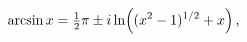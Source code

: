 \[\mathop{\mathrm{arcsin}\/}\nolimits x=\tfrac{1}{2}\pi\pm i\mathop{\ln\/}%
\nolimits\!\left((x^{2}-1)^{1/2}+x\right),\]